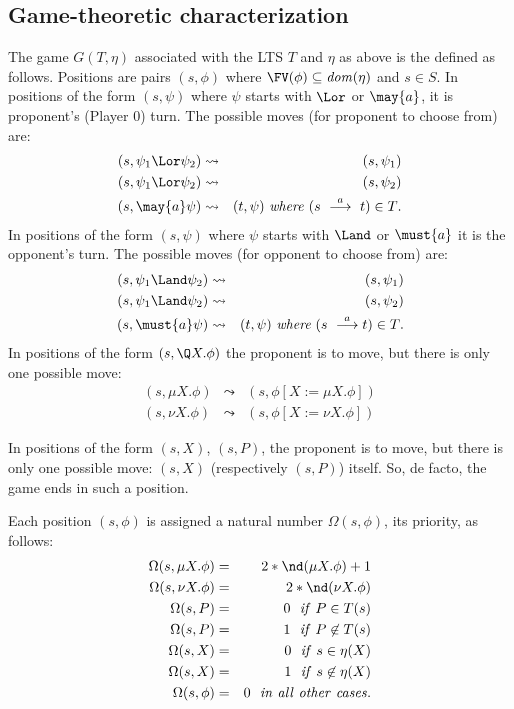 \subsection{Game-theoretic characterization}

The game $G(T,\eta)$ associated with the LTS $T$ and $\eta$ as above
is the defined as follows.
Positions are pairs $(s,\phi)$ where $\FV(\phi) \subseteq  \mathit{dom}(\eta)$ and $s\in S$\@. 
In positions of the form $(s,\psi)$ where $\psi$ starts with $\Lor$ or $\may{a}$, it is
proponent's (Player 0) turn. The possible moves (for proponent to choose from)
are:
   \begin{eqnarray*}
(s, \psi_1 \Lor \psi_2) &\leadsto& (s, \psi_1) \\
(s,\psi_1 \Lor  \psi_2) &\leadsto& (s, \psi_2) \\
     (s,\may{a}\psi) &\leadsto& (t,\psi) ~\mathit{where}~(s~\stackrel{a}{\longrightarrow}~t) \in T\mbox{.}
   \end{eqnarray*}
In positions of the form $(s,\psi)$ where $\psi$ starts with $\Land$ or $\must{a}$ it is
the opponent's turn. The possible moves (for opponent to choose from)
 are: 
 \begin{eqnarray*}
  (s,\psi_1 \Land \psi_2)   &\leadsto& (s, \psi_1)  \\
    (s,\psi_1 \Land \psi_2) &\leadsto& (s, \psi_2) \\
            (s,\must{a}\psi)  &\leadsto& (t,\psi) ~\textit{where}~(s~\stackrel{a}{\longrightarrow} t) \in T\mbox{.}
 \end{eqnarray*}
In positions of the form $(s,\Q X.\phi)$ the proponent is to move, but
there is only one possible move:
 \begin{eqnarray*}
(s,\mu X.\phi) &\leadsto& (s,\phi[X := \mu X.\phi]) \\
(s,\nu X.\phi) &\leadsto& (s,\phi[X := \nu X.\phi])
 \end{eqnarray*}

In positions of the form $(s,X)$, $(s,P)$, the proponent is to move, but
there is only one possible move: $(s,X)$ (respectively $(s,P)$) itself. 
So, de facto, the game ends in such a position.

Each position $(s,\phi)$ is assigned a natural number $\Omega(s,\phi)$, its
priority, as follows:
\begin{eqnarray*}
\Omega(s,\mu X.\phi) &=& 2 * \nd(\mu X.\phi) + 1  \\
\Omega(s,\nu X.\phi) &=& 2 * \nd(\nu X.\phi)\\
\Omega(s,P) &=& 0 ~~\mathit{if}~P \in T(s)\\
\Omega(s,P) &=& 1  ~~\mathit{if}~P \not\in T(s)\\
\Omega(s,X) &=& 0  ~~\mathit{if}~s \in \eta(X)\\
\Omega(s,X) &=& 1  ~~\mathit{if}~s \not\in \eta(X)\\
\Omega(s,\phi) &=& 0 ~~\mathit{in~all~other~cases}. 
\end {eqnarray*}




